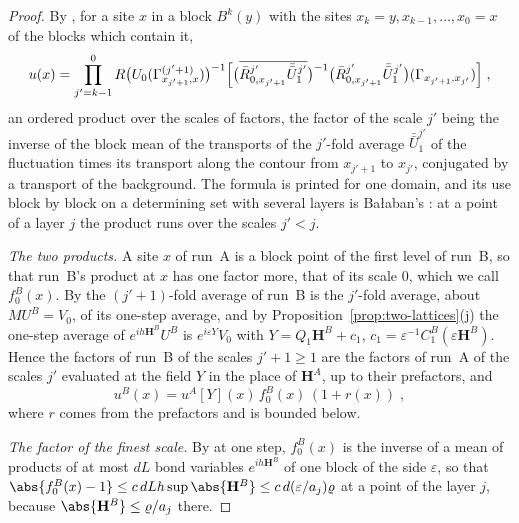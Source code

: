 \begin{proof}
By \cite[(106)]{BalabanAVG}, for a site $x$ in a block $B^k(y)$ with the sites $x_k = y, x_{k-1}, \dots, x_0 = x$ of the blocks which contain it,
\[
    u(x) = \prod_{j'=k-1}^{0}R\bigl(U_0(\Gamma^{(j'+1)}_{x_{j'+1},x})\bigr)^{-1}\Bigl[\bigl(\overline{\bar R^{j'}_{0,x_{j'+1}}\bar{\bar U}^{j'}_1}\bigr)^{-1}\bigl(\bar R^{j'}_{0,x_{j'+1}}\bar{\bar U}^{j'}_1\bigr)(\Gamma_{x_{j'+1},x_{j'}})\Bigr]\;,
\]
an ordered product over the scales of factors, the factor of the scale $j'$ being the inverse of the block mean \cite[(105)]{BalabanAVG} of the transports of the $j'$-fold average $\bar{\bar U}^{j'}_1$ of the fluctuation \cite[(90), (91)]{BalabanAVG} times its transport along the contour from $x_{j'+1}$ to $x_{j'}$, conjugated by a transport of the background. The formula is printed for one domain, and its use block by block on a determining set with several layers is Ba{\l}aban's \cite[p.~373]{BalabanLFR2}: at a point of a layer $j$ the product runs over the scales $j' < j$.

\emph{The two products.} A site $x$ of run~A is a block point of the first level of run~B, so that run~B's product at $x$ has one factor more, that of its scale $0$, which we call $f^B_0(x)$. By \cite[(91)]{BalabanAVG} the $(j' + 1)$-fold average of run~B is the $j'$-fold average, about $MU^B = V_0$, of its one-step average, and by Proposition~\ref{prop:two-lattices}(j) the one-step average of $e^{ih\mathbf H^B}U^B$ is $e^{i\varepsilon Y}V_0$ with $Y = Q_1\mathbf H^B + c_1$, $c_1 = \varepsilon^{-1}C^B_1(\varepsilon\mathbf H^B)$. Hence the factors of run~B of the scales $j' + 1 \geq 1$ are the factors of run~A of the scales $j'$ evaluated at the field $Y$ in the place of $\mathbf H^A$, up to their prefactors, and
\[
    u^B(x) = u^A[Y](x)\,f^B_0(x)\,(1 + r(x))\;,
\]
where $r$ comes from the prefactors and is bounded below.

\emph{The factor of the finest scale.} By \cite[(82), (87)]{BalabanAVG} at one step, $f^B_0(x)$ is the inverse of a mean of products of at most $dL$ bond variables $e^{ih\mathbf H^B}$ of one block of the side $\varepsilon$, so that $\abs{f^B_0(x) - 1} \leq c\,dLh\sup\abs{\mathbf H^B} \leq c\,d(\varepsilon/a_j)\varrho$ at a point of the layer $j$, because $\abs{\mathbf H^B} \leq \varrho/a_j$ there.


\end{proof}

